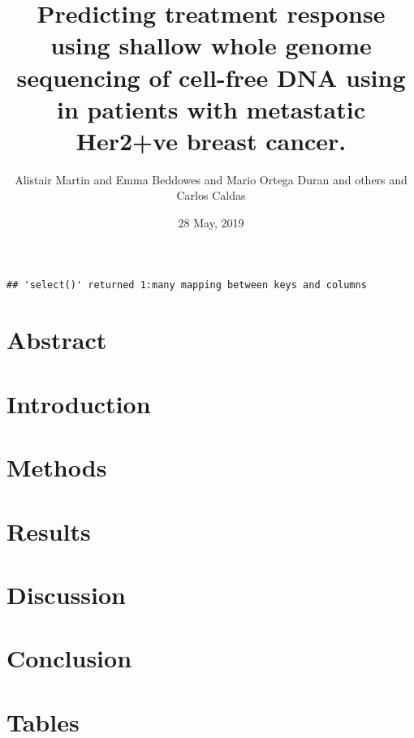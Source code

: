 \documentclass[]{article}
\title{Predicting treatment response using shallow whole genome sequencing of cell-free DNA using in patients with metastatic Her2+ve breast cancer.}
\author{Alistair Martin and Emma Beddowes and Mario Ortega Duran and others and Carlos Caldas}
\date{28 May, 2019}
\begin{document}
\maketitle

\begin{verbatim}
## 'select()' returned 1:many mapping between keys and columns
\end{verbatim}

\hypertarget{abstract}{%
\section{Abstract}\label{abstract}}

\hypertarget{introduction}{%
\section{Introduction}\label{introduction}}

\hypertarget{methods}{%
\section{Methods}\label{methods}}

\hypertarget{results}{%
\section{Results}\label{results}}

\hypertarget{discussion}{%
\section{Discussion}\label{discussion}}

\hypertarget{conclusion}{%
\section{Conclusion}\label{conclusion}}

\clearpage

\hypertarget{tables}{%
\section{Tables}\label{tables}}
\end{document}
